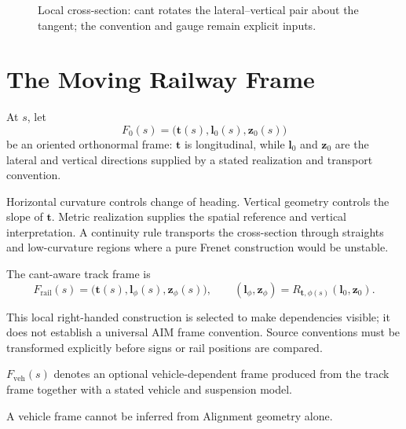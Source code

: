 \begin{figure}[htbp]
\centering

\caption{Local cross-section: cant rotates the lateral--vertical pair about the tangent; the convention and gauge remain explicit inputs.}
\label{fig:cant-interpretation}
\end{figure}

\section{The Moving Railway Frame}

\begin{definition}
\label{def:uncanted-frame}
At \(s\), let
\[
F_0(s)=\bigl(\mathbf t(s),\mathbf l_0(s),\mathbf z_0(s)\bigr)
\]
be an oriented orthonormal frame: \(\mathbf t\) is longitudinal, while
\(\mathbf l_0\) and \(\mathbf z_0\) are the lateral and vertical directions
supplied by a stated realization and transport convention.
\end{definition}

Horizontal curvature controls change of heading. Vertical geometry controls
the slope of \(\mathbf t\). Metric realization supplies the spatial reference
and vertical interpretation. A continuity rule transports the cross-section
through straights and low-curvature regions where a pure Frenet construction
would be unstable.

\begin{definition}
\label{def:railway-frame}
The cant-aware track frame is
\[
F_{\mathrm{rail}}(s)=
\bigl(\mathbf t(s),\mathbf l_\phi(s),\mathbf z_\phi(s)\bigr),
\qquad
(\mathbf l_\phi,\mathbf z_\phi)
=R_{\mathbf t,\phi(s)}(\mathbf l_0,\mathbf z_0).
\]
\end{definition}

This local right-handed construction is selected to make dependencies
visible; it does not establish a universal AIM frame convention. Source
conventions must be transformed explicitly before signs or rail positions are
compared.

\begin{definition}
\label{def:vehicle-frame}
\(F_{\mathrm{veh}}(s)\) denotes an optional vehicle-dependent frame produced
from the track frame together with a stated vehicle and suspension model.
\end{definition}

A vehicle frame cannot be inferred from Alignment geometry alone.

